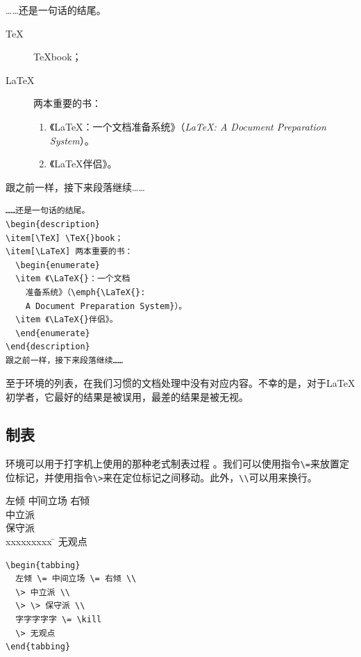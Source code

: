 \begin{codelist}[2.9]{
    ……还是一句话的结尾。
    \begin{description}
    \item[\TeX] \TeX{}book；
    \item[\LaTeX] 两本重要的书：
      \begin{enumerate}
      \item 《\LaTeX{}：一个文档准备系统》（\emph{\LaTeX{}: A Document Preparation System}）。
      \item 《\LaTeX{}伴侣》。
      \end{enumerate}
    \end{description}
    跟之前一样，接下来段落继续……
}\begin{verbatim}……还是一句话的结尾。
\begin{description}
\item[\TeX] \TeX{}book；
\item[\LaTeX] 两本重要的书：
  \begin{enumerate}
  \item 《\LaTeX{}：一个文档
    准备系统》（\emph{\LaTeX{}: 
    A Document Preparation System}）。
  \item 《\LaTeX{}伴侣》。
  \end{enumerate}
\end{description}
跟之前一样，接下来段落继续……
\end{verbatim}
\end{codelist}

至于环境的列表，在我们习惯的文档处理中没有对应内容。不幸的是，对于\LaTeX 初学者，它最好的结果是被误用，最差的结果是被无视。

\subsection{制表}

环境可以用于打字机上使用的那种老式制表过程%
。我们可以使用指令\verb|\=|来放置定位标记，并使用指令\verb|\>|来在定位标记之间移动。此外，\verb|\\|可以用来换行。

\begin{codelist}[2.10]{
  \begin{tabbing}
    左倾 \= 中间立场 \= 右倾 \\
    \> 中立派 \\
    \> \> 保守派 \\
    xxxxxxxxx \= \kill
    \> 无观点
    \end{tabbing}
}\begin{verbatim}
\begin{tabbing}
  左倾 \= 中间立场 \= 右倾 \\
  \> 中立派 \\
  \> \> 保守派 \\
  字字字字字 \= \kill
  \> 无观点
\end{tabbing}
\end{verbatim}
\end{codelist}

